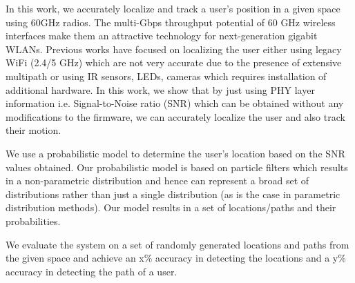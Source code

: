 In this work, we accurately localize and track a user's position in 
a given space using 60GHz radios.
The multi-Gbps throughput potential of 60 GHz wireless interfaces make them an 
attractive technology for next-generation gigabit WLANs.
Previous works have focused on localizing the user either using legacy
WiFi (2.4/5 GHz) which are not very accurate due to the presence of extensive multipath or using IR sensors, 
LEDs, cameras which requires installation of 
additional hardware.
In this work, we show that by just using PHY layer information i.e. Signal-to-Noise ratio (SNR) which can be
obtained without any modifications to the firmware,
we can accurately localize the user and also track their motion.

We use a probabilistic model to determine the user's location based on the SNR values obtained. 
Our probabilistic model is based on particle filters which results in a non-parametric distribution
and hence can represent a broad set of distributions rather than just a single distribution (as is the case in
parametric distribution methods). Our model results in a set of locations/paths and their probabilities.

We evaluate the system on a set of randomly generated locations and paths from the given space and
achieve an x\% accuracy in detecting the locations and a y\% accuracy in detecting the path of a user.